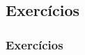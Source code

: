 \subsection[Exercícios]{Exercícios}\label{subsec:sec99-lista-1-exercicios}



\begin{frame}[t]\frametitle{Exercícios}


\end{frame}
